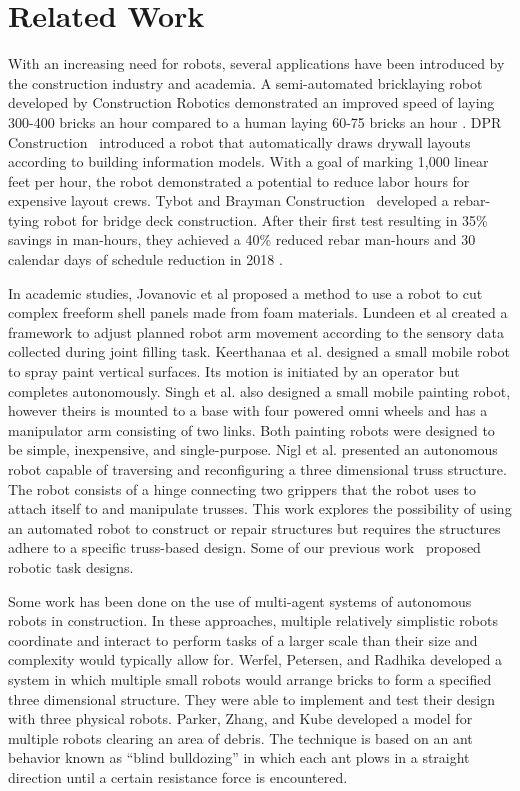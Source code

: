 \section{Related Work}\label{sec:related_work}

With an increasing need for robots, several applications have been introduced by the construction industry and academia. A semi-automated bricklaying robot developed by Construction Robotics demonstrated an improved speed of laying 300-400 bricks an hour compared to a human laying 60-75 bricks an hour \cite{bricklaying1}. DPR Construction~\cite{DPR1} introduced a robot that automatically draws drywall layouts according to building information models. With a goal of marking 1,000 linear feet per hour, the robot demonstrated a potential to reduce labor hours for expensive layout crews. Tybot and Brayman Construction~\cite{rebar1} developed a rebar-tying robot for bridge deck construction. After their first test resulting in 35\% savings in man-hours, they achieved a 40\% reduced rebar man-hours and 30 calendar days of schedule reduction in 2018 \cite{rebar2}. 

In academic studies, Jovanovic et al \cite{jovanovic2017robotic} proposed a method to use a robot to cut complex freeform shell panels made from foam materials. Lundeen et al \cite{lundeen2019autonomous} created a framework to adjust planned robot arm movement according to the sensory data collected during joint filling task. Keerthanaa et al. \cite{keerthanaa2013automatic} designed a small mobile robot to spray paint vertical surfaces. Its motion is initiated by an operator but completes autonomously. Singh et al. \cite{singh2018arduino} also designed a small mobile painting robot, however theirs is mounted to a base with four powered omni wheels and has a manipulator arm consisting of two links. Both painting robots were designed to be simple, inexpensive, and single-purpose. Nigl et al. \cite{nigl2013structure} presented an autonomous robot capable of traversing and reconfiguring a three dimensional truss structure. The robot consists of a hinge connecting two grippers that the robot uses to attach itself to and manipulate trusses. This work explores the possibility of using an automated robot to construct or repair structures but requires the structures adhere to a specific truss-based design. Some of our previous work~\cite{huang2018tradeoffs,huang2018skill} proposed robotic task designs.

Some work has been done on the use of multi-agent systems of autonomous robots in construction. In these approaches, multiple relatively simplistic robots coordinate and interact to perform tasks of a larger scale than their size and complexity would typically allow for. Werfel, Petersen, and Radhika \cite{werfel2014designing} developed a system in which multiple small robots would arrange bricks to form a specified three dimensional structure. They were able to implement and test their design with three physical robots. Parker, Zhang, and Kube \cite{parker2003blind} developed a model for multiple robots clearing an area of debris. The technique is based on an ant behavior known as ``blind bulldozing'' in which each ant plows in a straight direction until a certain resistance force is encountered.
